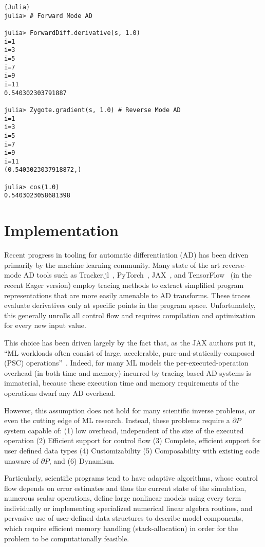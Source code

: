 \documentclass{juliacon}
\begin{document}
\begin{lstlisting}{Julia}
julia> # Forward Mode AD

julia> ForwardDiff.derivative(s, 1.0)
i=1
i=3
i=5
i=7
i=9
i=11
0.540302303791887

julia> Zygote.gradient(s, 1.0) # Reverse Mode AD
i=1
i=3
i=5
i=7
i=9
i=11
(0.5403023037918872,)

julia> cos(1.0)
0.5403023058681398 
\end{lstlisting}

    
\section{Implementation}
\label{Impl}

    Recent progress in tooling for automatic differentiation (AD) has been driven primarily by the machine learning community. Many state of the art reverse-mode AD tools such as Tracker.jl~\cite{Flux.jl-2018,2019sbc}, PyTorch~\cite{pytorch}, JAX~\cite{jax}, and TensorFlow~\cite{tensorflow} (in the recent Eager version) employ tracing methods to extract simplified program representations that are more easily amenable to AD transforms. These traces evaluate derivatives only at specific points in the program space. Unfortunately, this generally unrolls all control flow and requires compilation and optimization for every new input value.
    
    This choice has been driven largely by the fact that, as the JAX authors put it, ``ML workloads often consist of large, accelerable, pure-and-statically-composed (PSC) operations''~\cite{jax}. Indeed, for many ML models the per-executed-operation overhead (in both time and memory) incurred by tracing-based AD systems is immaterial, because these execution time and memory requirements of the operations dwarf any AD overhead.
    
    However, this assumption does not hold for many scientific inverse problems, or even the cutting edge of ML research. Instead, these problems require a $\partial P$ system capable of: (1) low overhead, independent of the size of the executed operation (2) Efficient support for control flow (3) Complete, efficient support for user defined data types (4) Customizability (5) Composability with existing code unaware of $\partial P$, and (6) Dynamism.

    Particularly, scientific programs tend to have adaptive algorithms, whose control flow depends on error estimates and thus the current state of the simulation, numerous scalar operations, define large nonlinear models using every term individually or implementing specialized numerical linear algebra routines, and pervasive use of user-defined data structures to describe model components, which require efficient memory handling (stack-allocation) in order for the problem to be computationally feasible. 
\end{document}
